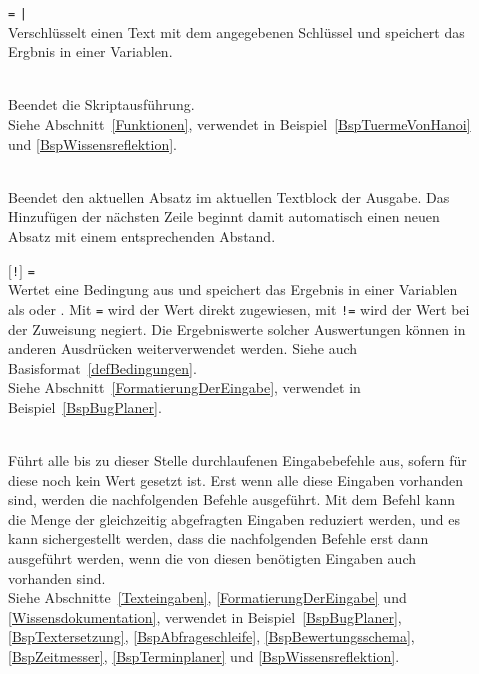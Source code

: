 \begin{description}
\item[]  \verb|=|  \verb=|= \\
Verschlüsselt einen Text mit dem angegebenen Schlüssel und speichert das Ergbnis in einer Variablen.

\item[]\mbox{}\\
Beendet die Skriptausführung.\\
Siehe Abschnitt~\ref{Funktionen}, verwendet in Beispiel~\ref{BspTuermeVonHanoi} und \ref{BspWissensreflektion}.

\item[]\mbox{}\\
Beendet den aktuellen Absatz im aktuellen Textblock der Ausgabe. Das Hinzufügen der nächsten Zeile beginnt damit automatisch einen neuen Absatz mit einem entsprechenden Abstand.

\item[]  $[$\verb|!|$]$ \verb|=| \\
Wertet eine Bedingung aus und speichert das Ergebnis in einer Variablen als  oder . Mit \verb|=| wird der Wert direkt zugewiesen, mit \verb|!=| wird der Wert bei der Zuweisung negiert. Die Ergebniswerte solcher Auswertungen können in anderen Ausdrücken weiterverwendet werden. Siehe auch Basisformat~\ref{defBedingungen}.\\
Siehe Abschnitt~\ref{FormatierungDerEingabe}, verwendet in Beispiel~\ref{BspBugPlaner}.

\item[]\mbox{}\\
Führt alle bis zu dieser Stelle durchlaufenen Eingabebefehle aus, sofern für diese noch kein Wert gesetzt ist. Erst wenn alle diese Eingaben vorhanden sind, werden die nachfolgenden Befehle ausgeführt.
Mit dem Befehl kann die Menge der gleichzeitig abgefragten Eingaben reduziert werden, und es kann sichergestellt werden, dass die nachfolgenden Befehle erst dann ausgeführt werden, wenn die von diesen benötigten Eingaben auch vorhanden sind.\\
Siehe Abschnitte~\ref{Texteingaben}, \ref{FormatierungDerEingabe} und \ref{Wissensdokumentation}, verwendet in Beispiel~\ref{BspBugPlaner}, \ref{BspTextersetzung}, \ref{BspAbfrageschleife}, \ref{BspBewertungsschema}, \ref{BspZeitmesser}, \ref{BspTerminplaner} und \ref{BspWissensreflektion}.


\end{description}
